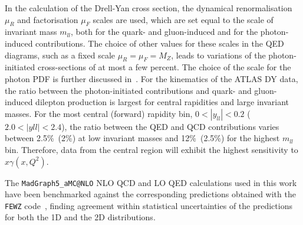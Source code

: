 In the  calculation of the Drell-Yan cross section, the
dynamical renormalisation $\mu_{R}$ and factorisation $\mu_{F}$
scales are used, which are set equal to the scale of invariant mass $m_{ll}$,
both for the quark- and gluon-induced and for the photon-induced
contributions.
%
The choice of other values for these scales in the QED diagrams,
such as a fixed scale $\mu_R=\mu_F=M_Z$, leads 
to  variations of the photon-initiated cross-sections of at most a few percent.
%
The choice of the scale for the photon PDF  is further discussed
in~\cite{Harland-Lang:2016lhw,Dittmaier:2009cr}.
%
For the kinematics of the ATLAS DY data, the ratio between the photon-initiated
contributions and  quark- and gluon-induced dilepton production is largest
for central rapidities and large invariant masses. 
%
For the most central (forward) rapidity
bin, $0 < |y_{ll}| < 0.2$ ($2.0 < |yll| < 2.4$), the ratio
between the QED and QCD contributions varies between 2.5\%~(2\%) at low
invariant masses and 12\%~(2.5\%) for the highest $m_{ll}$ bin.
%
Therefore, data from the central region will exhibit the highest
sensitivity to $x\gamma(x,Q^2)$.

The {\tt MadGraph5{\_}aMC@NLO} NLO QCD and LO QED calculations used in this work have been
benchmarked against the corresponding predictions  obtained with the {\tt FEWZ}
code~\cite{Gavin:2012sy}, finding agreement within statistical uncertainties of
the predictions for both the 1D and the 2D distributions.

